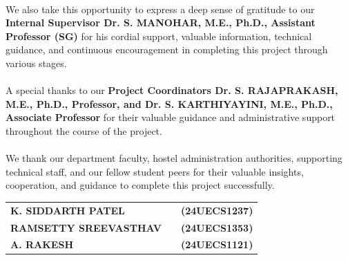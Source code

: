 \documentclass[10pt]{report}
\begin{document}
\begin{sloppypar}
{\paragraph{}We also take this opportunity to express a deep sense of gratitude to our \textbf{Internal Supervisor Dr. S. MANOHAR, M.E., Ph.D., Assistant Professor (SG)} for his cordial support, valuable information, technical guidance, and continuous encouragement in completing this project through various stages.

\paragraph{}A special thanks to our \textbf{Project Coordinators Dr. S. RAJAPRAKASH, M.E., Ph.D., Professor, and Dr. S. KARTHIYAYINI, M.E., Ph.D., Associate Professor} for their valuable guidance and administrative support throughout the course of the project.

\paragraph{}We thank our department faculty, hostel administration authorities, supporting technical staff, and our fellow student peers for their valuable insights, cooperation, and guidance to complete this project successfully.}
\end{sloppypar}

\vspace{1.5cm}
\begin{flushright}
\begin{tabular}{>{\bfseries}lc>{\bfseries}r}
K. SIDDARTH PATEL & & (24UECS1237)\\
RAMSETTY SREEVASTHAV & & (24UECS1353)\\
A. RAKESH & & (24UECS1121)
\end{tabular}
\end{flushright}
\end{document}
